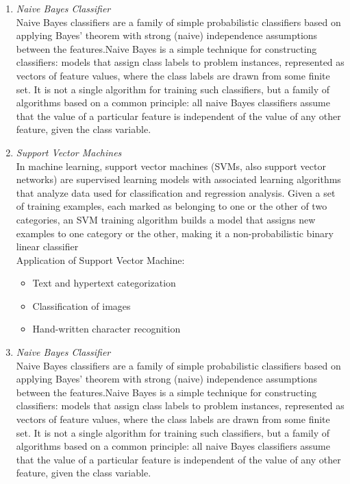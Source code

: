 \documentclass[a4paper,12pt]{report}
\begin{document}
\begin{enumerate}
    	\item \emph{Naive Bayes Classifier}\\ 
    	Naive Bayes classifiers are a family of simple probabilistic classifiers based on applying Bayes' 		theorem with strong (naive) independence assumptions between the features.Naive Bayes is a simple 		technique for constructing classifiers: models that assign class labels to problem instances, 				represented as vectors of feature values, where the class labels are drawn from some finite set. 			It is not a single algorithm for training such classifiers, but a family of algorithms based on a 		common principle: all naive Bayes classifiers assume that the value of a particular feature is 				independent of the value of any other feature, given the class variable.
       	\\
    	\vfill
    	\item \emph{Support Vector Machines}\\
    	In machine learning, support vector machines (SVMs, also support vector networks) are supervised 			learning models with associated learning algorithms that analyze data used for classification and 		regression analysis. Given a set of training examples, each marked as belonging to one or the 				other of two categories, an SVM training algorithm builds a model that assigns new examples to 				one category or the other, making it a non-probabilistic binary linear classifier 
       	\\
    	Application of Support Vector Machine:
    	\begin{itemize}
    		\item Text and hypertext categorization
    		\item Classification of images
    		\item Hand-written character recognition    		   
      \end{itemize}
      
    	\item \emph{Naive Bayes Classifier}\\
    	Naive Bayes classifiers are a family of simple probabilistic classifiers based on applying Bayes' 		theorem with strong (naive) independence assumptions between the features.Naive Bayes is a simple 		technique for constructing classifiers: models that assign class labels to problem instances, 				represented as vectors of feature values, where the class labels are drawn from some finite set. 			It is not a single algorithm for training such classifiers, but a family of algorithms based on a 		common principle: all naive Bayes classifiers assume that the value of a particular feature is 				independent of the value of any other feature, given the class variable.
    \end{enumerate}
    
\end{document}
